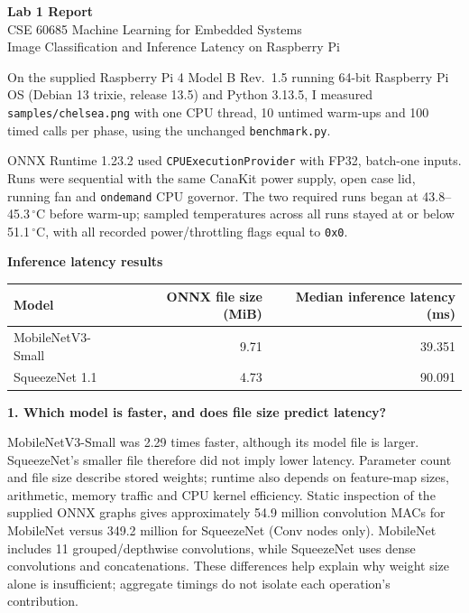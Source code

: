 \documentclass[11pt,letterpaper]{article}
\newcommand{\topic}[1]{\par\smallskip\textbf{#1}\par\nopagebreak}
\begin{document}
\begin{center}
{\Large\bfseries Lab 1 Report}\\[5pt]
CSE 60685 Machine Learning for Embedded Systems\\[3pt]
Image Classification and Inference Latency on Raspberry Pi
\end{center}

On the supplied Raspberry Pi 4 Model B Rev.\ 1.5 running 64-bit Raspberry Pi OS (Debian 13 trixie, release 13.5) and Python 3.13.5, I measured \texttt{samples/chelsea.png} with one CPU thread, 10 untimed warm-ups and 100 timed calls per phase, using the unchanged \texttt{benchmark.py}.

ONNX Runtime 1.23.2 used \texttt{CPUExecutionProvider} with FP32, batch-one inputs. Runs were sequential with the same CanaKit power supply, open case lid, running fan and \texttt{ondemand} CPU governor. The two required runs began at 43.8--45.3\,$^{\circ}$C before warm-up; sampled temperatures across all runs stayed at or below 51.1\,$^{\circ}$C, with all recorded power/throttling flags equal to \texttt{0x0}.

\topic{Inference latency results}
\begin{center}
\begin{tabular}{lrr}
\toprule
Model & ONNX file size (MiB) & Median inference latency (ms)\\
\midrule
MobileNetV3-Small & 9.71 & 39.351\\
SqueezeNet 1.1 & 4.73 & 90.091\\
\bottomrule
\end{tabular}
\end{center}

\topic{1. Which model is faster, and does file size predict latency?}
MobileNetV3-Small was 2.29 times faster, although its model file is larger. SqueezeNet's smaller file therefore did not imply lower latency. Parameter count and file size describe stored weights; runtime also depends on feature-map sizes, arithmetic, memory traffic and CPU kernel efficiency. Static inspection of the supplied ONNX graphs gives approximately 54.9 million convolution MACs for MobileNet versus 349.2 million for SqueezeNet (Conv nodes only). MobileNet includes 11 grouped/depthwise convolutions, while SqueezeNet uses dense convolutions and concatenations. These differences help explain why weight size alone is insufficient; aggregate timings do not isolate each operation's contribution.
\end{document}
